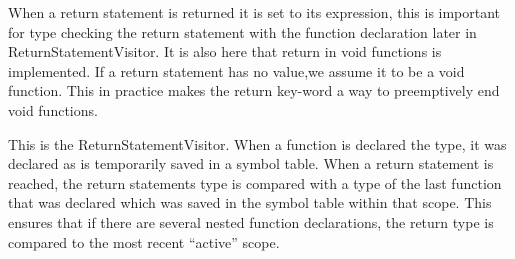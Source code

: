 When a return statement is returned it is set to its expression, this is important for type checking the return statement with the function declaration later in ReturnStatementVisitor.
It is also here that return in void functions is implemented. If a return statement has no value,we assume it to be a void function. This in practice makes the return key-word a way to preemptively end void functions.
\begin{figure}[H]
\centering
{}
\caption{}
\label{lf05}
\end{figure}
This is the ReturnStatementVisitor. When a function is declared the type, it was declared as is temporarily saved in a symbol table. When a return statement is reached, the return statements type is compared with a type of the last function that was declared which was saved in the symbol table within that scope. This ensures that if there are several nested function declarations, the return type is compared to the most recent “active” scope.
\begin{figure}[H]
\centering
{}
\caption{}
\label{lf05}
\end{figure}
 \begin{figure}[H]
\centering
{}
\caption{}
\label{lf05}
\end{figure}


